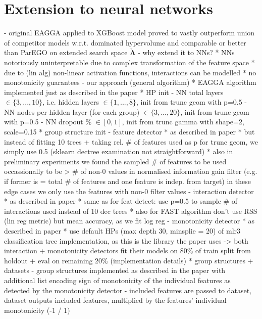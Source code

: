 \documentclass[twoside,11pt]{article}
\begin{document}
\section{Extension to neural networks}
- original EAGGA applied to XGBoost model proved to vastly outperform union of competitor models w.r.t. dominated hypervolume and comparable or better than ParEGO on
  extended search space $\check{\boldsymbol\Lambda}$ \citep[pp. 543-545]{EAGGA}
- why extend it to NNs?
  * NNs notoriously uninterpretable due to complex transformation of the feature space
  * due to (lin alg) non-linear activation functions, interactions can be modelled
  * no monotonicity guarantees
- our approach
  (general algorithm)
  * EAGGA algorithm implemented just as described in the paper
  * HP init
    - NN total layers $\in\{3, ..., 10\}$, i.e. hidden layers $\in\{1, ..., 8\}$, init from trunc geom with p=0.5
    - NN nodes per hidden layer (for each group) $\in\{3, ..., 20\}$, init from trunc geom with p=0.5
    - NN dropout \% $\in[0, 1]$, init from trunc gamma with shape=2, scale=0.15
  * group structure init
    - feature detector
      * as described in paper
      * but instead of fitting 10 trees + taking rel. \# of features used as p for trunc geom, we simply use 0.5 (sklearn dectree examination not straightforward)
      * also in preliminary experiments we found the sampled \# of features to be used occassionally to be > \# of non-0 values in normalised information gain filter
        (e.g. if former is = total \# of features and one feature is indep. from target) in these edge cases we only use the features with non-0 filter values
    - interaction detector
      * as described in paper
      * same as for feat detect: use p=0.5 to sample \# of interactions used instead of 10 dec trees
      * also for FAST algorithm don't use RSS (lin reg metric) but mean accuracy, as we fit log reg
    - monotonicity detector
      * as described in paper
      * use default HPs (max depth 30, minsplie = 20) of mlr3 classification tree implementation, as this is the library the paper uses
    -> both interaction + monotonicity detectors fit their models on 80\% of train split from holdout + eval on remaining 20\%
  (implementation details)
  * group structures + datasets
    - group structures implemented as described in the paper with additional list encoding sign of monotonicity of the individual features as detected by the
      monotonicity detector
    - included features are passed to dataset, dataset outputs included features, multiplied by the features' individual monotonicity (-1 / 1)
\end{document}
